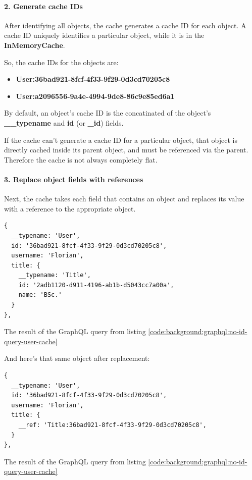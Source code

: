 \paragraph{2. Generate cache IDs}

After identifying all objects, the cache generates a cache ID for each object. A cache ID uniquely identifies a particular object, while it is in the \textbf{InMemoryCache}.

So, the cache IDs for the objects are:

\begin{itemize}
    \item \textbf{User:36bad921-8fcf-4f33-9f29-0d3cd70205c8}
    \item \textbf{User:a2096556-9a4e-4994-9de8-86c9e85ed6a1}
\end{itemize}

\noindent By default, an object's cache ID is the concatinated of the object's \textbf{\_\_typename} and \textbf{id} (or \textbf{\_id}) fields.

\noindent If the cache can't generate a cache ID for a particular object, that object is directly cached inside its parent object, and must be referenced via the parent. Therefore the cache is not always completely flat.

\paragraph{3. Replace object fields with references}

Next, the cache takes each field that contains an object and replaces its value with a reference to the appropriate object.

\ifshowListings
\begin{listing}[H]
    \begin{verbatim}
{
  __typename: 'User',
  id: '36bad921-8fcf-4f33-9f29-0d3cd70205c8',
  username: 'Florian',
  title: {
    __typename: 'Title',
    id: '2adb1120-d911-4196-ab1b-d5043cc7a00a',
    name: 'BSc.'
  }
},
    \end{verbatim}
    \caption{The result of the GraphQL query from listing \ref{code:background:graphql:no-id-query-user-cache}}
\end{listing}
\fi

And here's that same object after replacement:

\ifshowListings
\begin{listing}[H]
    \begin{verbatim}
{
  __typename: 'User',
  id: '36bad921-8fcf-4f33-9f29-0d3cd70205c8',
  username: 'Florian',
  title: {
    __ref: 'Title:36bad921-8fcf-4f33-9f29-0d3cd70205c8',
  }
},
    \end{verbatim}
    \caption{The result of the GraphQL query from listing \ref{code:background:graphql:no-id-query-user-cache}}
\end{listing}
\fi


